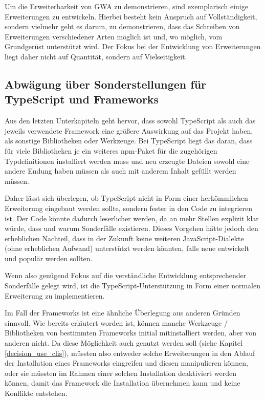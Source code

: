 Um die Erweiterbarkeit von \gls{GWA} zu demonstrieren, sind exemplarisch einige Erweiterungen zu entwickeln. Hierbei besteht kein Anspruch auf Vollständigkeit, sondern vielmehr geht es darum, zu demonstrieren, dass das Schreiben von Erweiterungen verschiedener Arten möglich ist und, wo möglich, vom Grundgerüst unterstützt wird. Der Fokus bei der Entwicklung von Erweiterungen liegt daher nicht auf Quantität, sondern auf Vielseitigkeit.

\subsection{Abwägung über Sonderstellungen für TypeScript und Frameworks}
Aus den letzten Unterkapiteln geht hervor, dass sowohl TypeScript als auch das jeweils verwendete Framework eine größere Auswirkung auf das Projekt haben, als sonstige Bibliotheken oder Werkzeuge. Bei TypeScript liegt das daran, dass für viele Bibliotheken je ein weiteres \gls{npm}-Paket für die zugehörigen Typdefinitionen installiert werden muss und neu erzeugte Dateien sowohl eine andere Endung haben müssen als auch mit anderem Inhalt gefüllt werden müssen.

Daher lässt sich überlegen, ob TypeScript nicht in Form einer herkömmlichen Erweiterung eingebaut werden sollte, sondern fester in den Code zu integrieren ist. Der Code könnte dadurch leserlicher werden, da an mehr Stellen explizit klar würde, dass und warum Sonderfälle existieren. Dieses Vorgehen hätte jedoch den erheblichen Nachteil, dass in der Zukunft keine weiteren JavaScript-Dialekte (ohne erheblichen Aufwand) unterstützt werden könnten, falls neue entwickelt und populär werden sollten.

Wenn also genügend Fokus auf die verständliche Entwicklung entsprechender Sonderfälle gelegt wird, ist die TypeScript-Unterstützung in Form einer normalen Erweiterung zu implementieren.

Im Fall der Frameworks ist eine ähnliche Überlegung aus anderen Gründen sinnvoll. Wie bereits erläutert worden ist, können manche Werkzeuge / Bibliotheken von bestimmten Frameworks initial mitinstalliert werden, aber von anderen nicht. Da diese Möglichkeit auch genutzt werden soll (siehe Kapitel \ref{decision_use_clis}), müssten also entweder solche Erweiterungen in den Ablauf der Installation eines Frameworks eingreifen und diesen manipulieren können, oder sie müssten im Rahmen einer solchen Installation deaktiviert werden können, damit das Framework die Installation übernehmen kann und keine Konflikte entstehen.

